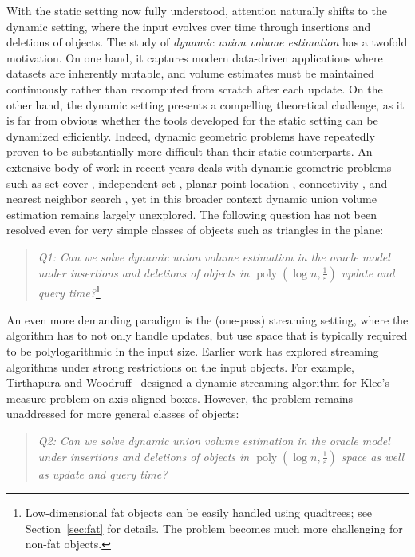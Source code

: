 \documentclass[11pt]{article}
\def\poly{\operatorname{poly}}
\newcommand{\eps}{\varepsilon}
\begin{document}
%
With the static setting now fully understood, attention naturally shifts to the dynamic setting, where the input evolves over time through insertions and deletions of objects. The study of \emph{dynamic union volume estimation} has a twofold motivation. On one hand, it captures modern data-driven applications where datasets are inherently mutable, and volume estimates must be maintained continuously rather than recomputed from scratch after each update. On the other hand, the dynamic setting presents a compelling theoretical challenge, as it is far from obvious whether the tools developed for the static setting can be dynamized efficiently.
Indeed, dynamic geometric problems have repeatedly proven to be substantially more difficult than their static counterparts. An extensive body of work in recent years deals with dynamic geometric problems such as set cover \cite{AgarwalCSXX22, ChanHSX25}, independent set \cite{Henzinger0W20, BhoreNTW24, BhoreC25}, planar point location \cite{Nekrich21}, connectivity \cite{ChanPR11, ChanH24a}, and nearest neighbor search \cite{AgarwalAS18}, yet in this broader context dynamic union volume estimation remains largely unexplored. The following question has not been resolved even for very simple classes of objects such as triangles in the plane:
%
\begin{quote}
\begin{center}
   \emph{Q1: Can we solve dynamic union volume estimation in the oracle model under insertions and deletions of objects in $\poly \left( \log n, \frac{1}{\eps} \right)$ update and query time?}\footnote{Low-dimensional fat objects can be easily handled using quadtrees; see Section~\ref{sec:fat} for details. The problem becomes much more challenging for non-fat objects.}
\end{center}
\end{quote}
%
An even more demanding paradigm is the (one-pass) streaming setting, where the algorithm has to not only handle updates, but use space that is typically required to be polylogarithmic in the input size. Earlier work has explored streaming algorithms under strong restrictions on the input objects. For example, Tirthapura and Woodruff~\cite{TW12} designed a dynamic streaming algorithm for Klee’s measure problem on axis-aligned boxes. However, the problem remains unaddressed for more general classes of objects:
%
\begin{quote}
\begin{center}
   \emph{Q2: Can we solve dynamic union volume estimation in the oracle model under insertions and deletions of objects in $\poly \left( \log n, \frac{1}{\eps} \right)$ space as well as update and query time?}
\end{center}
\end{quote}
\end{document}
